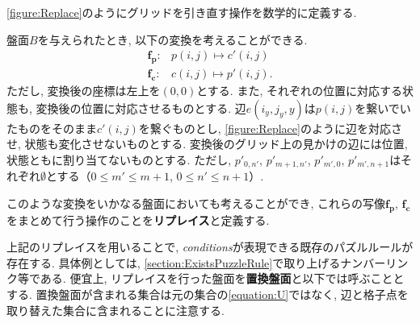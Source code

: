 \cref{figure:Replace}のようにグリッドを引き直す操作を数学的に定義する.
\begin{definition}[リプレイス]\label{definition:Replace}
  盤面$B$を与えられたとき, 以下の変換を考えることができる.
  \begin{align}
    \bm{f_p}\colon & p(i,j)  \longmapsto c'(i,j)  \\
    \bm{f_c}\colon & c(i,j)  \longmapsto p'(i,j).
  \end{align}
  ただし, 変換後の座標は左上を$(0,0)$とする.
  また, それぞれの位置に対応する状態も, 変換後の位置に対応させるものとする. 辺$e(i_y,j_y,y)$は$p(i,j)$を繋いでいたものをそのまま$c'(i,j)$を繋ぐものとし, \cref{figure:Replace}のように辺を対応させ, 状態も変化させないものとする. 変換後のグリッド上の見かけの辺には位置, 状態ともに割り当てないものとする. ただし, $p'_{0,n'}$, $p'_{m+1,n'}$, $p'_{m',0}$, $p'_{m',n+1}$はそれぞれ$\emptyset$とする$（0\le m' \le m+1$, $0\le n'\le n+1）$.

  このような変換をいかなる盤面においても考えることができ, これらの写像$\bm{f_p}$, $\bm{f_c}$をまとめて行う操作のことを\textbf{リプレイス}と定義する.
\end{definition}
上記のリプレイスを用いることで, \textit{conditions}が表現できる既存のパズルルールが存在する. 具体例としては, \cref{section:ExistsPuzzleRule}で取り上げるナンバーリンク等である. 便宜上, リプレイスを行った盤面を\textbf{置換盤面}と以下では呼ぶこととする. 置換盤面が含まれる集合は元の集合の\cref{equation:U}ではなく, 辺と格子点を取り替えた集合に含まれることに注意する.



